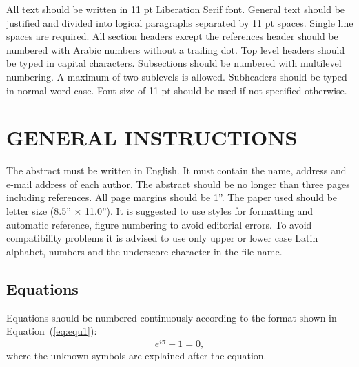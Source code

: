 \documentclass{icsc}
\begin{document}
All text should be written in 11 pt Liberation Serif font. General text should
be justified and divided into logical paragraphs separated by 11 pt spaces.
Single line spaces are required. All section headers except the references
header should be numbered with Arabic numbers without a trailing dot. Top level
headers should be typed in capital characters. Subsections should be numbered
with multilevel numbering. A maximum of two sublevels is allowed. Subheaders
should be typed in normal word case. Font size of 11 pt should be used if not
specified otherwise.


\section{GENERAL INSTRUCTIONS}
%
The abstract must be written in English. It must contain the name, address and
e-mail address of each author. The abstract should be no longer than three
pages including references. All page margins should be 1''. The paper used
should be letter size (8.5'' $\times$ 11.0''). It is suggested to use styles
for formatting and automatic reference, figure numbering to avoid editorial
errors.  To avoid compatibility problems it is advised to use only upper or
lower case Latin alphabet, numbers and the underscore character in the file
name.

\subsection{Equations}
%
Equations should be numbered continuously according to the format shown in
Equation~(\ref{eq:equ1}):
\begin{equation} \label{eq:equ1}
  e^{i\pi} + 1 = 0,
\end{equation}
where the unknown symbols are explained after the equation.
\end{document}
